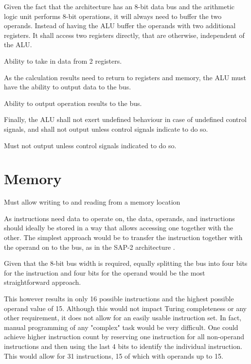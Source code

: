 Given the fact that the architecture has an 8-bit data bus and the arithmetic logic unit performs 8-bit operations, it will always need to buffer the two operands. Instead of having the ALU buffer the operands with two additional registers. It shall access two registers directly, that are otherwise, independent of the ALU.

\begin{arch-requirement}
  Ability to take in data from 2 registers.
\end{arch-requirement}

As the calculation results need to return to registers and memory, the ALU must have the ability to output data to the bus.
\begin{arch-requirement}
  Ability to output operation results to the bus. 
\end{arch-requirement}

Finally, the ALU shall not exert undefined behaviour in case of undefined control signals, and shall not output unless control signals indicate to do so. 


\begin{feat-requirement} \label{req:alu-no-output}
  Must not output unless control signals indicated to do so. 
\end{feat-requirement}

\section{Memory}

\begin{turing-requirement}
Must allow writing to and reading from a memory location
\end{turing-requirement}

As instructions need data to operate on, the data, operands, and instructions should ideally be stored in a way that allows accessing one together with the other. The simplest approach would be to transfer the instruction together with the operand on to the bus, as in the SAP-2 architecture \cite{malvino1983a}.

Given that the 8-bit bus width is required, equally splitting the bus into four bits for the instruction and four bits for the operand would be the most straightforward approach.

This however results in only 16 possible instructions and the highest possible operand value of 15. Although this would not impact Turing completeness or any other requirement, it does not allow for an easily usable instruction set. In fact, manual programming of any "complex" task would be very difficult. One could achieve higher instruction count by reserving one instruction for all non-operand instructions and then using the last 4 bits to identify the individual instruction. This would allow for 31 instructions, 15 of which with operands up to 15.

